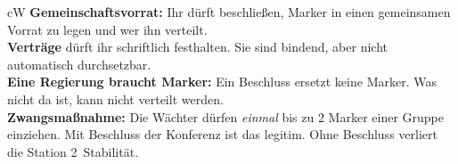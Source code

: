 \begin{metrobox}[title={5 \ Regierung, Verträge, Zwangsmaßnahme},fonttitle=\bfseries]{cW}
\textbf{Gemeinschaftsvorrat:} Ihr dürft beschließen, Marker in einen gemeinsamen Vorrat zu legen und wer ihn verteilt.\\
\textbf{Verträge} dürft ihr schriftlich festhalten. Sie sind bindend, aber nicht automatisch durchsetzbar.\\
\textbf{Eine Regierung braucht Marker:} Ein Beschluss ersetzt keine Marker. Was nicht da ist, kann nicht verteilt werden.\\
\textbf{Zwangsmaßnahme:} Die Wächter dürfen \emph{einmal} bis zu 2 Marker einer Gruppe einziehen. Mit Beschluss der Konferenz ist das legitim. Ohne Beschluss verliert die Station 2~Stabilität.
\end{metrobox}
